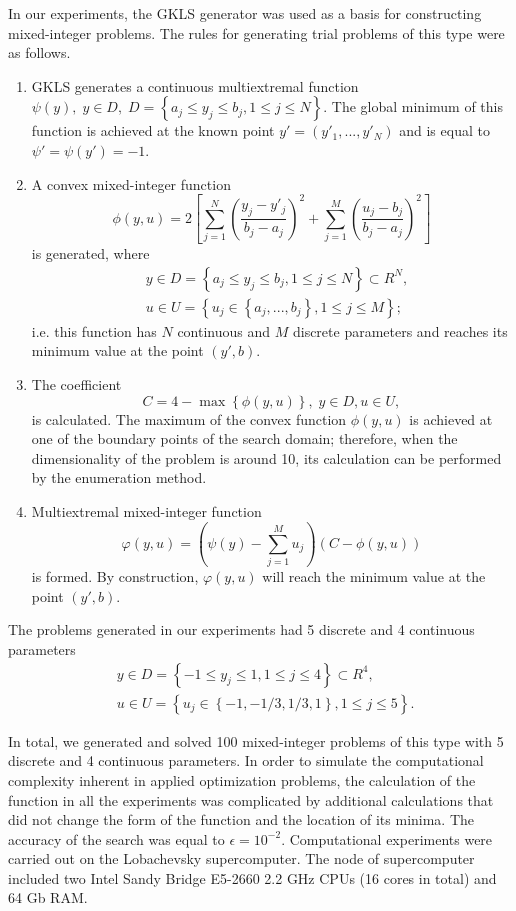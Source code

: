 \documentclass[
11pt,%
tightenlines,%
twoside,%
onecolumn,%
nofloats,%
nobibnotes,%
nofootinbib,%
superscriptaddress,%
noshowpacs,%
centertags]%
{revtex4}
\begin{document}
In our experiments, the GKLS generator was used as a basis for constructing mixed-integer problems. The rules for generating trial problems of this type were as follows.

\begin{enumerate}
	\item GKLS generates a continuous multiextremal function $\psi(y), \; y\in D, \; D = \left\{ a_j\leq y_j\leq b_j, 1\leq j \leq N \right\}$. The global minimum of this function is achieved at the known point $y'=(y'_1,...,y'_N)$ and is equal to $\psi'=\psi(y')=-1$.
	\item A convex mixed-integer function
	\[
			\phi (y,u) = 2 \left[ \sum_{j=1}^N \left( \frac{y_j - y'_j}{b_j-a_j} \right)^2 + \sum_{j=1}^M \left( \frac{u_j - b_j}{b_j-a_j} \right)^2 \right]
	\]
	is generated, where 
	\begin{eqnarray*}
	& y\in D = \left\{ a_j\leq y_j\leq b_j, 1\leq j \leq N \right\} \subset R^N, \\
	& u\in U = \left\{ u_j \in  \left\{a_j, ..., b_j \right\}, 1\leq j \leq M \right\};
	\end{eqnarray*}
	i.e. this function has $N$ continuous and $M$ discrete parameters and reaches its minimum value at the point $(y',b)$.
	\item The coefficient
	\[
	C = 4 - \max \left\{ \phi(y,u) \right\}, \; y\in D, u \in U,
	\]
	is calculated. The maximum of the convex function $\phi(y,u)$ is achieved at one of the boundary points of the search domain; therefore, when the dimensionality of the problem is around 10, its calculation can be performed by the enumeration method. 
	\item  Multiextremal mixed-integer function
	\[
	\varphi(y,u) = \left(\psi(y) - \sum_{j=1}^M{u_j}\right)\left(C - \phi(y,u)\right)
	\]
	is formed. By construction, $\varphi(y,u)$ will reach the minimum value at the point $(y',b)$.
	
\end{enumerate}


The problems generated in our experiments had 5 discrete and 4 continuous parameters 
	\begin{eqnarray*}
	& y\in D = \left\{ -1 \leq y_j\leq 1, 1\leq j \leq 4 \right\} \subset R^4, \\
	& u\in U = \left\{ u_j \in  \left\{-1, -1/3, 1/3, 1 \right\}, 1\leq j \leq 5 \right\}.
	\end{eqnarray*}


In total, we generated and solved 100 mixed-integer problems of this type with 5 discrete and 4 continuous parameters. In order to simulate the computational complexity inherent in applied optimization problems, the calculation of the function in all the experiments was complicated by additional calculations that did not change the form of the function and the location of its minima.
The accuracy of the search was equal to $\epsilon = 10^{-2}$. Computational experiments were carried out on the Lobachevsky supercomputer. The node of supercomputer included two Intel Sandy Bridge E5-2660 2.2 GHz CPUs (16 cores in total) and 64 Gb RAM. 
\end{document}
